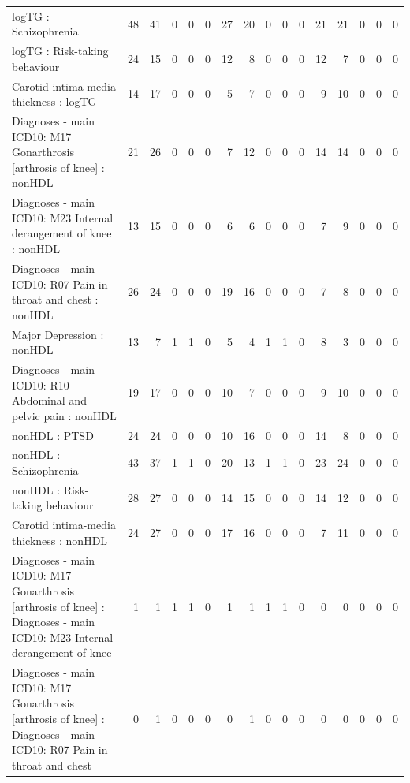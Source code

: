 \begin{table}[ht]
\begin{tabular}{lrrrrrrrrrrrrrrr}
  logTG : Schizophrenia &  48 &  41 &   0 &   0 &   0 &  27 &  20 &   0 &   0 &   0 &  21 &  21 &   0 &   0 &   0 \\ 
  logTG : Risk-taking behaviour &  24 &  15 &   0 &   0 &   0 &  12 &   8 &   0 &   0 &   0 &  12 &   7 &   0 &   0 &   0 \\ 
  Carotid intima-media thickness : logTG &  14 &  17 &   0 &   0 &   0 &   5 &   7 &   0 &   0 &   0 &   9 &  10 &   0 &   0 &   0 \\ 
  Diagnoses - main ICD10: M17 Gonarthrosis [arthrosis of knee] : nonHDL &  21 &  26 &   0 &   0 &   0 &   7 &  12 &   0 &   0 &   0 &  14 &  14 &   0 &   0 &   0 \\ 
  Diagnoses - main ICD10: M23 Internal derangement of knee : nonHDL &  13 &  15 &   0 &   0 &   0 &   6 &   6 &   0 &   0 &   0 &   7 &   9 &   0 &   0 &   0 \\ 
  Diagnoses - main ICD10: R07 Pain in throat and chest : nonHDL &  26 &  24 &   0 &   0 &   0 &  19 &  16 &   0 &   0 &   0 &   7 &   8 &   0 &   0 &   0 \\ 
  Major Depression : nonHDL &  13 &   7 &   1 &   1 &   0 &   5 &   4 &   1 &   1 &   0 &   8 &   3 &   0 &   0 &   0 \\ 
  Diagnoses - main ICD10: R10 Abdominal and pelvic pain : nonHDL &  19 &  17 &   0 &   0 &   0 &  10 &   7 &   0 &   0 &   0 &   9 &  10 &   0 &   0 &   0 \\ 
  nonHDL : PTSD &  24 &  24 &   0 &   0 &   0 &  10 &  16 &   0 &   0 &   0 &  14 &   8 &   0 &   0 &   0 \\ 
  nonHDL : Schizophrenia &  43 &  37 &   1 &   1 &   0 &  20 &  13 &   1 &   1 &   0 &  23 &  24 &   0 &   0 &   0 \\ 
  nonHDL : Risk-taking behaviour &  28 &  27 &   0 &   0 &   0 &  14 &  15 &   0 &   0 &   0 &  14 &  12 &   0 &   0 &   0 \\ 
  Carotid intima-media thickness : nonHDL &  24 &  27 &   0 &   0 &   0 &  17 &  16 &   0 &   0 &   0 &   7 &  11 &   0 &   0 &   0 \\ 
  Diagnoses - main ICD10: M17 Gonarthrosis [arthrosis of knee] : Diagnoses - main ICD10: M23 Internal derangement of knee &   1 &   1 &   1 &   1 &   0 &   1 &   1 &   1 &   1 &   0 &   0 &   0 &   0 &   0 &   0 \\ 
  Diagnoses - main ICD10: M17 Gonarthrosis [arthrosis of knee] : Diagnoses - main ICD10: R07 Pain in throat and chest &   0 &   1 &   0 &   0 &   0 &   0 &   1 &   0 &   0 &   0 &   0 &   0 &   0 &   0 &   0 \\ 

\end{tabular}
\end{table}
